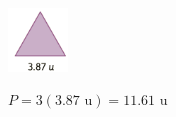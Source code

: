 \begin{multicols}{2}
\begin{parts}
        \centering \includegraphics[width=0.12\textwidth]{../images/20230319021450}
        \begin{solutionbox}{1.5cm}$P=3 \left( 3.87 \text{ u}\right)=11.61\text{ u}$\end{solutionbox}
    \end{parts}
\end{multicols}
